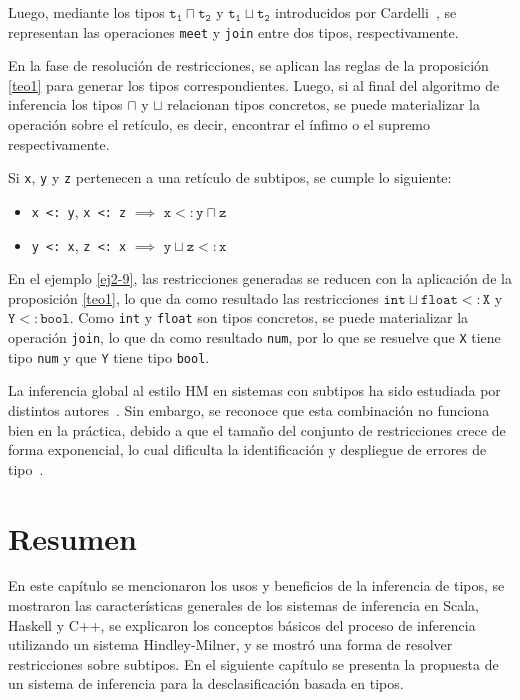 Luego, mediante los tipos $\mathtt{t_1 \sqcap t_2}$ y $\mathtt{t_1 \sqcup t_2}$ introducidos por Cardelli~\cite{cardelli}, se representan las operaciones \texttt{meet} y \texttt{join} entre dos tipos, respectivamente.

En la fase de resolución de restricciones, se aplican las reglas de la proposición \ref{teo1} para generar los tipos correspondientes. Luego, si al final del algoritmo de inferencia los tipos $\sqcap$ y $\sqcup$ relacionan tipos concretos, se puede materializar la operación sobre el retículo, es decir, encontrar el ínfimo o el supremo respectivamente.


\begin{prop} \label{teo1} \normalfont Si \texttt{x}, \texttt{y} y \texttt{z} pertenecen a una retículo de subtipos, se cumple lo siguiente:
  \begin{itemize}
    \item \texttt{x <: y}, \texttt{x <: z} $\implies$ $\mathtt{x <: y \sqcap z}$
    \item \texttt{y <: x}, \texttt{z <: x} $\implies$ $\mathtt{y \sqcup z <: x}$
  \end{itemize}
\end{prop}

En el ejemplo \ref{ej2-9}, las restricciones generadas se reducen con la aplicación de la proposición \ref{teo1}, lo que da como resultado las restricciones $\mathtt{int\sqcup float <: X}$ y $\mathtt{Y <: bool}$. Como \texttt{int} y \texttt{float} son tipos concretos, se puede materializar la operación \texttt{join}, lo que da como resultado \texttt{num}, por lo que se resuelve que \texttt{X} tiene tipo \texttt{num} y que \texttt{Y} tiene tipo \texttt{bool}.

La inferencia global al estilo HM en sistemas con subtipos ha sido estudiada por distintos autores~\cite{odersky2}. Sin embargo, se reconoce que esta combinación no funciona bien en la práctica, debido a que el tamaño del conjunto de restricciones crece de forma exponencial, lo cual dificulta la identificación y despliegue de errores de tipo~\cite{odersky2}.

\section*{Resumen}
En este capítulo se mencionaron los usos y beneficios de la inferencia de tipos, se mostraron las características generales de los sistemas de inferencia en Scala, Haskell y C++, se explicaron los conceptos básicos del proceso de inferencia utilizando un sistema Hindley-Milner, y se mostró una forma de resolver restricciones sobre subtipos. En el siguiente capítulo se presenta la propuesta de un sistema de inferencia para la desclasificación basada en tipos.


